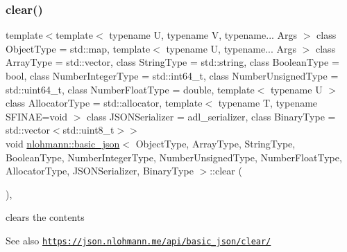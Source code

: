 \subsubsection{\texorpdfstring{clear()}{clear()}}
{\footnotesize\ttfamily template$<$template$<$ typename U, typename V, typename... Args $>$ class Object\+Type = std\+::map, template$<$ typename U, typename... Args $>$ class Array\+Type = std\+::vector, class String\+Type  = std\+::string, class Boolean\+Type  = bool, class Number\+Integer\+Type  = std\+::int64\+\_\+t, class Number\+Unsigned\+Type  = std\+::uint64\+\_\+t, class Number\+Float\+Type  = double, template$<$ typename U $>$ class Allocator\+Type = std\+::allocator, template$<$ typename T, typename S\+F\+I\+N\+A\+E=void $>$ class J\+S\+O\+N\+Serializer = adl\+\_\+serializer, class Binary\+Type  = std\+::vector$<$std\+::uint8\+\_\+t$>$$>$ \\
void \hyperlink{classnlohmann_1_1basic__json}{nlohmann\+::basic\+\_\+json}$<$ Object\+Type, Array\+Type, String\+Type, Boolean\+Type, Number\+Integer\+Type, Number\+Unsigned\+Type, Number\+Float\+Type, Allocator\+Type, J\+S\+O\+N\+Serializer, Binary\+Type $>$\+::clear (\begin{DoxyParamCaption}{ }\end{DoxyParamCaption})\hspace{0.3cm}{\ttfamily [inline]}, {\ttfamily [noexcept]}}



clears the contents 

\begin{DoxySeeAlso}{See also}
\href{https://json.nlohmann.me/api/basic_json/clear/}{\tt https\+://json.\+nlohmann.\+me/api/basic\+\_\+json/clear/} 
\end{DoxySeeAlso}
\mbox{\label{classnlohmann_1_1basic__json_a02c9bc4d0f33b7dec20b2798301d6971}} 
